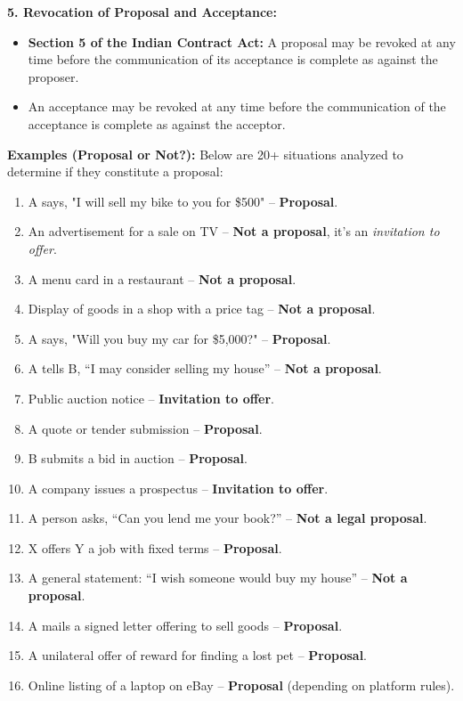 \documentclass[12pt,a4paper]{book}
\begin{document}
\textbf{5. Revocation of Proposal and Acceptance:}  
\begin{itemize}
    \item \textbf{Section 5 of the Indian Contract Act:} A proposal may be revoked at any time before the communication of its acceptance is complete as against the proposer.
    \item An acceptance may be revoked at any time before the communication of the acceptance is complete as against the acceptor.
\end{itemize}

\textbf{Examples (Proposal or Not?):}  
Below are 20+ situations analyzed to determine if they constitute a proposal:

\begin{enumerate}
    \item A says, "I will sell my bike to you for \$500" – \textbf{Proposal}.
    \item An advertisement for a sale on TV – \textbf{Not a proposal}, it's an \textit{invitation to offer}.
    \item A menu card in a restaurant – \textbf{Not a proposal}.
    \item Display of goods in a shop with a price tag – \textbf{Not a proposal}.
    \item A says, "Will you buy my car for \$5,000?" – \textbf{Proposal}.
    \item A tells B, “I may consider selling my house” – \textbf{Not a proposal}.
    \item Public auction notice – \textbf{Invitation to offer}.
    \item A quote or tender submission – \textbf{Proposal}.
    \item B submits a bid in auction – \textbf{Proposal}.
    \item A company issues a prospectus – \textbf{Invitation to offer}.
    \item A person asks, “Can you lend me your book?” – \textbf{Not a legal proposal}.
    \item X offers Y a job with fixed terms – \textbf{Proposal}.
    \item A general statement: “I wish someone would buy my house” – \textbf{Not a proposal}.
    \item A mails a signed letter offering to sell goods – \textbf{Proposal}.
    \item A unilateral offer of reward for finding a lost pet – \textbf{Proposal}.
    \item Online listing of a laptop on eBay – \textbf{Proposal} (depending on platform rules).

\end{enumerate}
\end{document}
